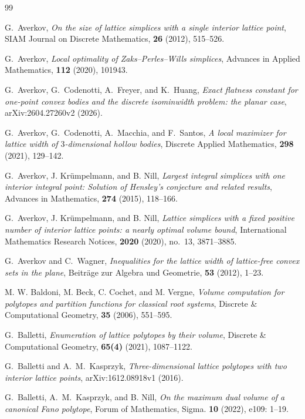 \documentclass[reqno, 11pt]{article}
\numberwithin{equation}{section}
\theoremstyle{definition}
\numberwithin{equation}{section}
\begin{document}
\begin{thebibliography}{99}

 G.~Averkov, \emph{On the size of lattice simplices with a single interior lattice point}, SIAM Journal on Discrete Mathematics, \textbf{26} (2012), 515--526.

 G.~Averkov, \emph{Local optimality of Zaks--Perles--Wills simplices}, Advances in Applied Mathematics, \textbf{112} (2020), 101943.

 G.~Averkov, G.~Codenotti, A.~Freyer, and K.~Huang, \emph{Exact flatness constant for one-point convex bodies and the discrete isominwidth problem: the planar case}, arXiv:2604.27260v2 (2026).


 G.~Averkov, G.~Codenotti, A.~Macchia, and F.~Santos, \emph{A local maximizer for lattice width of $3$-dimensional hollow bodies}, Discrete Applied Mathematics, \textbf{298} (2021), 129--142.

 G.~Averkov, J. Kr\"umpelmann, and B. Nill, \emph{Largest integral simplices with one interior integral point: Solution of Hensley's conjecture and related results}, Advances in Mathematics, \textbf{274} (2015), 118--166.

 G.~Averkov, J. Kr\"umpelmann, and B. Nill, \emph{Lattice simplices with a fixed positive number of interior lattice points: a nearly optimal volume bound}, International Mathematics Research Notices, \textbf{2020} (2020), no.~13, 3871--3885.


 G.~Averkov and C.~Wagner, \emph{Inequalities for the lattice width of lattice-free convex sets in the plane}, Beitr\"age zur Algebra und Geometrie, \textbf{53} (2012), 1--23.


M. W. Baldoni, M. Beck, C. Cochet, and M. Vergne, \emph{Volume computation for polytopes and partition functions for classical root systems}, Discrete \& Computational Geometry, \textbf{35} (2006), 551--595.

 G.~Balletti, \emph{Enumeration of lattice polytopes by their volume}, Discrete \& Computational Geometry, \textbf{65(4)} (2021), 1087--1122.

 G.~Balletti and A.~M.~Kasprzyk, \emph{Three-dimensional lattice polytopes with two interior lattice points}, arXiv:1612.08918v1 (2016).

 G.~Balletti, A.~M.~Kasprzyk, and B. Nill, \emph{On the maximum dual volume of a canonical Fano polytope}, Forum of Mathematics, Sigma. \textbf{10} (2022), e109: 1--19.


\end{thebibliography}
\end{document}
